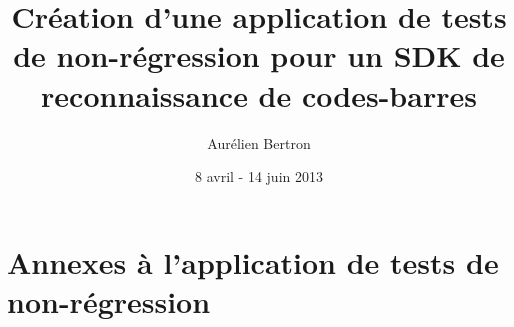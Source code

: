 \documentclass[10pt,a4paper]{report}
\author{Aurélien Bertron}
\date{8 avril - 14 juin 2013}
\title{Création d'une application de tests de non-régression pour un SDK de reconnaissance de codes-barres}
\begin{document}
\maketitle



\tableofcontents
\listoffigures











\appendix
\part*{Annexes à l'application de tests de non-régression}

\end{document}

